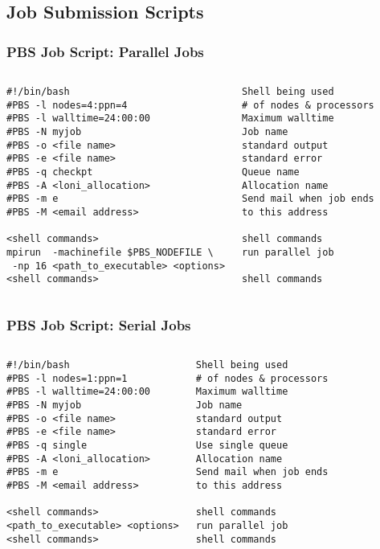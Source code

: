 \documentclass[slidestop,mathserif,compress,xcolor=svgnames,table]{beamer}
\newenvironment{ablock}[0]
{
\begin{beamerboxesrounded}[upper=uppercol,lower=lowercol,shadow=true]}
{\end{beamerboxesrounded}}
\newenvironment{eblock}[0]
{
\begin{beamerboxesrounded}[upper=uppercol2,lower=lowercol2,shadow=true]}
{\end{beamerboxesrounded}}
\begin{document}
\subsection{Job Submission Scripts}
\begin{frame}[fragile]
\frametitle{\small PBS Job Script: Parallel Jobs}
\begin{columns}
\column{7.2cm}
\begin{eblock}{}
{\footnotesize
\begin{verbatim}
#!/bin/bash
#PBS -l nodes=4:ppn=4
#PBS -l walltime=24:00:00
#PBS -N myjob
#PBS -o <file name>
#PBS -e <file name>
#PBS -q checkpt	
#PBS -A <loni_allocation>
#PBS -m e
#PBS -M <email address>

<shell commands>			
mpirun  -machinefile $PBS_NODEFILE \
 -np 16 <path_to_executable> <options>
<shell commands>
\end{verbatim}
}
\end{eblock}
\column{4.5cm}
\begin{ablock}{}
{\footnotesize %
\begin{verbatim}
Shell being used
# of nodes & processors
Maximum walltime
Job name
standard output
standard error
Queue name
Allocation name
Send mail when job ends 
to this address

shell commands
run parallel job

shell commands
\end{verbatim}
}
\end{ablock}
\end{columns}
\end{frame}

\begin{frame}[fragile]
\frametitle{\small PBS Job Script: Serial Jobs}
\begin{columns}
\column{7.2cm}
\begin{eblock}{}
{\footnotesize
\begin{verbatim}
#!/bin/bash
#PBS -l nodes=1:ppn=1
#PBS -l walltime=24:00:00
#PBS -N myjob
#PBS -o <file name>
#PBS -e <file name>
#PBS -q single	
#PBS -A <loni_allocation>
#PBS -m e
#PBS -M <email address>

<shell commands>			
<path_to_executable> <options>
<shell commands>
\end{verbatim}
}
\end{eblock}
\column{4.5cm}
\begin{ablock}{}
{\footnotesize %
\begin{verbatim}
Shell being used
# of nodes & processors
Maximum walltime
Job name
standard output
standard error
Use single queue 
Allocation name
Send mail when job ends 
to this address

shell commands
run parallel job
shell commands
\end{verbatim}
}
\end{ablock}
\end{columns}
\end{frame}
\end{document}
